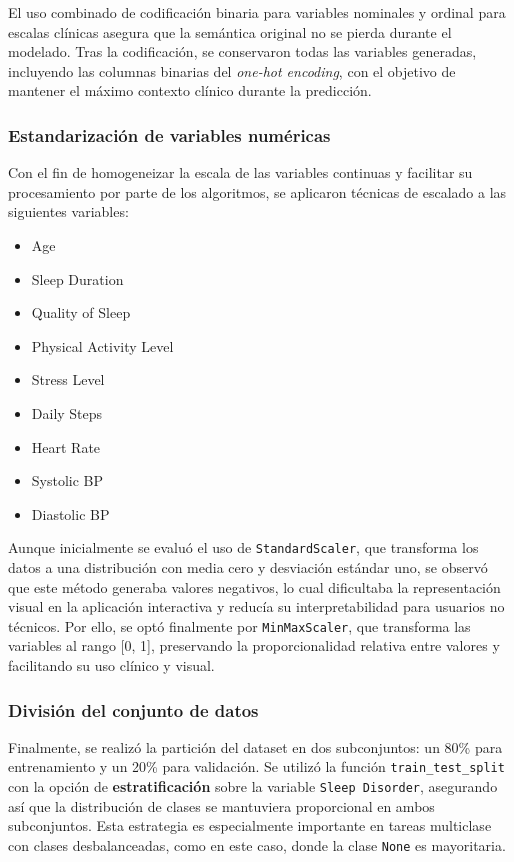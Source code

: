 El uso combinado de codificación binaria para variables nominales y ordinal para escalas clínicas asegura que la semántica original no se pierda durante el modelado. Tras la codificación, se conservaron todas las variables generadas, incluyendo las columnas binarias del \textit{one-hot encoding}, con el objetivo de mantener el máximo contexto clínico durante la predicción.

\subsubsection{Estandarización de variables numéricas}

Con el fin de homogeneizar la escala de las variables continuas y facilitar su procesamiento por parte de los algoritmos, se aplicaron técnicas de escalado a las siguientes variables:

\begin{itemize}
    \item Age
    \item Sleep Duration
    \item Quality of Sleep
    \item Physical Activity Level
    \item Stress Level
    \item Daily Steps
    \item Heart Rate
    \item Systolic BP
    \item Diastolic BP
\end{itemize}

Aunque inicialmente se evaluó el uso de \texttt{StandardScaler}, que transforma los datos a una distribución con media cero y desviación estándar uno, se observó que este método generaba valores negativos, lo cual dificultaba la representación visual en la aplicación interactiva y reducía su interpretabilidad para usuarios no técnicos. Por ello, se optó finalmente por \texttt{MinMaxScaler}, que transforma las variables al rango [0, 1], preservando la proporcionalidad relativa entre valores y facilitando su uso clínico y visual.


\subsubsection{División del conjunto de datos}

Finalmente, se realizó la partición del dataset en dos subconjuntos: un 80\% para entrenamiento y un 20\% para validación. Se utilizó la función \texttt{train\_test\_split} con la opción de \textbf{estratificación} sobre la variable \texttt{Sleep Disorder}, asegurando así que la distribución de clases se mantuviera proporcional en ambos subconjuntos. Esta estrategia es especialmente importante en tareas multiclase con clases desbalanceadas, como en este caso, donde la clase \texttt{None} es mayoritaria.

